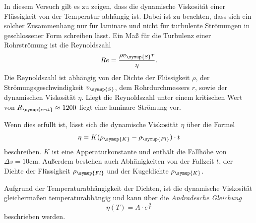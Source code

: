 In diesem Versuch gilt es zu zeigen, dass die dynamische Viskosität einer Flüssigkeit von der Temperatur abhängig ist. 
Dabei ist zu beachten, dass sich ein solcher Zusammenhang nur für laminare
und nicht für turbulente Strömungen in geschlossener Form schreiben lässt. Ein Maß für die Turbulenz einer Rohrströmung ist die Reynoldszahl
\begin{equation}
    Re=\frac{\rho v_{\symup{S}}r}{\eta}.
    \label{eqn:Reynoldszahl}
\end{equation}
Die Reynoldszahl ist abhängig von der Dichte der Flüssigkeit $\rho$, der Strömungsgeschwindigkeit $v_{\symup{S}}$, dem 
Rohrdurchmessers $r$, sowie der dynamischen Viskosität $\eta$. Liegt die Reynoldszahl unter einem kritischen Wert von
$R_{\symup{crit}}\approx 1200$ \cite[341/B102]{czichos} liegt eine laminare Strömung vor.

Wenn dies erfüllt ist, lässt sich die dynamische Viskosität $\eta$ über die Formel
\begin{equation}
    \eta = K(\rho_{\symup{K}}-\rho_{\symup{Fl}})\cdot t
    \label{eqn:Viskosität}
\end{equation}
beschreiben. $K$ ist eine Apperaturkonstante und enthält die Fallhöhe von $\Delta s=10\unit{\centi\metre}$. Außerdem
bestehen auch Abhänigkeiten von der Fallzeit $t$, der Dichte der Flüssigkeit $\rho_{\symup{Fl}}$ und der Kugeldichte
$\rho_{\symup{K}}$.

Aufgrund der Temperaturabhängigkeit der Dichten, ist die dynamische Viskosität gleichermaßen temperaturabhängig und kann über 
die \textit{Andradesche Gleichung}
\begin{equation}
    \eta (T)=A\cdot e^{\frac{B}{T}}
    \label{eqn:Andradesche Gleichung}
\end{equation}
beschrieben werden.



